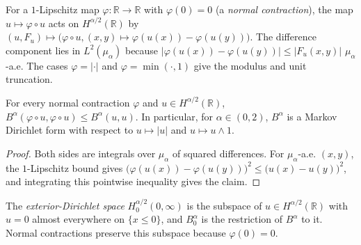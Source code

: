 \begin{definition}\label{def:gagliardo_normal_contraction}
\leanok
For a $1$-Lipschitz map $\varphi : \mathbb{R} \to \mathbb{R}$ with $\varphi(0) = 0$ (a \emph{normal contraction}), the map $u \mapsto \varphi \circ u$ acts on $H^{\alpha/2}(\mathbb{R})$ by $(u, F_u) \mapsto \bigl(\varphi \circ u, (x, y) \mapsto \varphi(u(x)) - \varphi(u(y))\bigr)$. The difference component lies in $L^2(\mu_\alpha)$ because $\lvert \varphi(u(x)) - \varphi(u(y)) \rvert \le \lvert F_u(x, y) \rvert$ $\mu_\alpha$-a.e. The cases $\varphi = \lvert \cdot \rvert$ and $\varphi = \min(\cdot, 1)$ give the modulus and unit truncation.
\end{definition}

\begin{theorem}\label{thm:gagliardo_form_markov}
\leanok
For every normal contraction $\varphi$ and $u \in H^{\alpha/2}(\mathbb{R})$, $B^\alpha(\varphi \circ u, \varphi \circ u) \le B^\alpha(u, u)$. In particular, for $\alpha \in (0, 2)$, $B^\alpha$ is a Markov Dirichlet form with respect to $u \mapsto \lvert u \rvert$ and $u \mapsto u \wedge 1$.
\end{theorem}

\begin{proof}
\leanok
Both sides are integrals over $\mu_\alpha$ of squared differences. For $\mu_\alpha$-a.e. $(x, y)$, the $1$-Lipschitz bound gives $\bigl(\varphi(u(x)) - \varphi(u(y))\bigr)^2 \le \bigl(u(x) - u(y)\bigr)^2$, and integrating this pointwise inequality gives the claim.
\end{proof}

\begin{definition}\label{def:restricted_gagliardo_space}
\leanok
The \emph{exterior-Dirichlet space} $H^{\alpha/2}_0(0, \infty)$ is the subspace of $u \in H^{\alpha/2}(\mathbb{R})$ with $u = 0$ almost everywhere on $\{x \le 0\}$, and $B^\alpha_0$ is the restriction of $B^\alpha$ to it. Normal contractions preserve this subspace because $\varphi(0) = 0$.
\end{definition}

